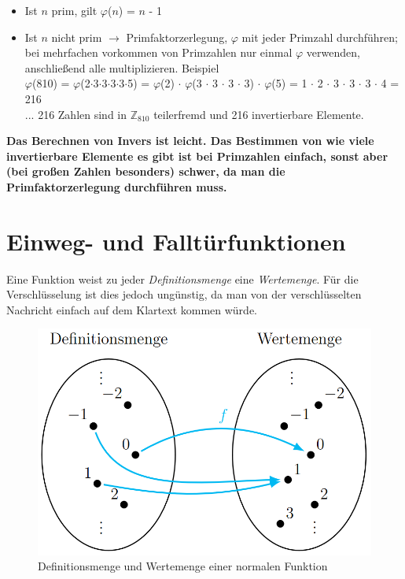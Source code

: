 \begin{itemize}
	\item Ist $n$ prim, gilt $\varphi$($n$) = $n$ - 1
	\item Ist $n$ nicht prim $\rightarrow$ Primfaktorzerlegung, $\varphi$ mit jeder Primzahl durchführen; bei mehrfachen vorkommen von Primzahlen nur einmal $\varphi$ verwenden, anschließend alle multiplizieren. Beispiel \\
	 $\varphi$(810) = $\varphi$(2$\cdot$3$\cdot$3$\cdot$3$\cdot$3$\cdot$5) = $\varphi$(2) $\cdot$ $\varphi$(3 $\cdot$ 3 $\cdot$ 3 $\cdot$ 3) $\cdot$ $\varphi$(5) = 1 $\cdot$ 2 $\cdot$ 3 $\cdot$ 3 $\cdot$ 3 $\cdot$ 4 = 216 \\
	 ... 216 Zahlen sind in $\mathbb{Z}_{810}$ teilerfremd und 216 invertierbare Elemente.
\end{itemize}

\textbf{Das Berechnen von Invers ist leicht. Das Bestimmen von wie viele invertierbare Elemente es gibt ist bei Primzahlen einfach, sonst aber (bei großen Zahlen besonders) schwer, da man die Primfaktorzerlegung durchführen muss.}

\section{Einweg- und Falltürfunktionen}
Eine Funktion weist zu jeder \textit{Definitionsmenge} eine \textit{Wertemenge}. Für die Verschlüsselung ist dies jedoch ungünstig, da man von der verschlüsselten Nachricht einfach auf dem Klartext kommen würde.
\begin{figure}[H]
	\centering
	\includegraphics[width=0.8\linewidth]{figures/normal_func.png}
	\caption{Definitionsmenge und Wertemenge einer normalen Funktion}
\end{figure}

